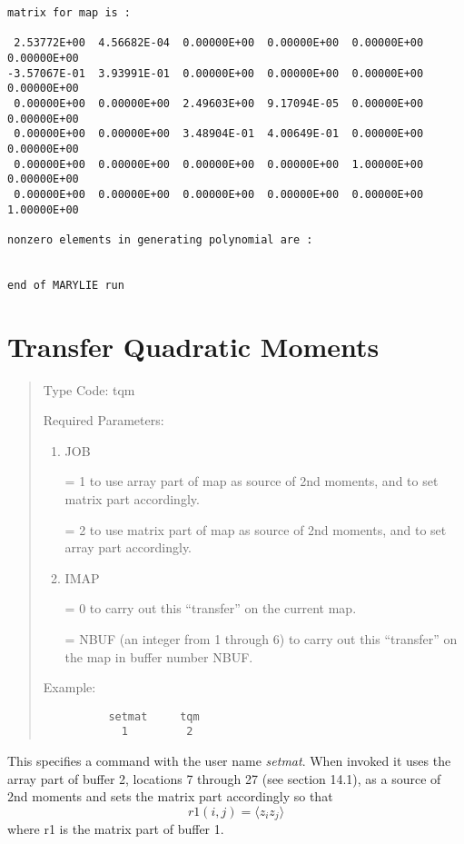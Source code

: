 \begin{footnotesize}
\begin{verbatim}
matrix for map is :

 2.53772E+00  4.56682E-04  0.00000E+00  0.00000E+00  0.00000E+00  0.00000E+00
-3.57067E-01  3.93991E-01  0.00000E+00  0.00000E+00  0.00000E+00  0.00000E+00
 0.00000E+00  0.00000E+00  2.49603E+00  9.17094E-05  0.00000E+00  0.00000E+00
 0.00000E+00  0.00000E+00  3.48904E-01  4.00649E-01  0.00000E+00  0.00000E+00
 0.00000E+00  0.00000E+00  0.00000E+00  0.00000E+00  1.00000E+00  0.00000E+00
 0.00000E+00  0.00000E+00  0.00000E+00  0.00000E+00  0.00000E+00  1.00000E+00

nonzero elements in generating polynomial are :


end of MARYLIE run
\end{verbatim}
\end{footnotesize}

\newpage
\section{Transfer Quadratic Moments}   
\begin{quotation}
\noindent Type Code:  tqm
\vspace{5mm}

\noindent Required Parameters:
\begin{enumerate}
       \item  JOB

              = 1 to use array part of map as source of 2nd moments, and to set matrix \hspace*{1em}part accordingly.

              = 2 to use matrix part of map as source of 2nd moments, and to set array \hspace*{1em}part accordingly.
       \item  IMAP

              = 0 to carry out this ``transfer'' on the current map.

              = NBUF (an integer from 1 through 6) to carry out this ``transfer'' on the \hspace*{1em}map in buffer number NBUF.

\end{enumerate}

\vspace{5mm}
\noindent Example:
\begin{verbatim}
          setmat     tqm
            1         2
\end{verbatim}
\end{quotation}
This specifies a command with the user name {\em setmat}.  When invoked it uses the array part of buffer 2, locations 7 through 27 (see section 14.1), as a source of 2nd moments and sets the matrix part accordingly so that
\[
r1(i,j) = \langle z_iz_j\rangle
\]
where r1 is the matrix part of buffer 1.

